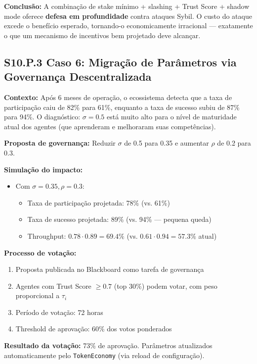 \textbf{Conclusão:} A combinação de stake mínimo + slashing + Trust Score + shadow mode oferece \textbf{defesa em profundidade} contra ataques Sybil. O custo do ataque excede o benefício esperado, tornando-o economicamente irracional --- exatamente o que um mecanismo de incentivos bem projetado deve alcançar.

\subsection*{S10.P.3 Caso 6: Migração de Parâmetros via Governança Descentralizada}

\textbf{Contexto:} Após 6 meses de operação, o ecossistema detecta que a taxa de participação caiu de 82\% para 61\%, enquanto a taxa de sucesso subiu de 87\% para 94\%. O diagnóstico: $\sigma = 0.5$ está muito alto para o nível de maturidade atual dos agentes (que aprenderam e melhoraram suas competências).

\textbf{Proposta de governança:} Reduzir $\sigma$ de 0.5 para 0.35 e aumentar $\rho$ de 0.2 para 0.3.

\textbf{Simulação do impacto:}
\begin{itemize}
    \item Com $\sigma = 0.35, \rho = 0.3$:
    \begin{itemize}
        \item Taxa de participação projetada: 78\% (vs. 61\%)
        \item Taxa de sucesso projetada: 89\% (vs. 94\% --- pequena queda)
        \item Throughput: $0.78 \cdot 0.89 = 69.4\%$ (vs. $0.61 \cdot 0.94 = 57.3\%$ atual)
    \end{itemize}
\end{itemize}

\textbf{Processo de votação:}
\begin{enumerate}
    \item Proposta publicada no Blackboard como tarefa de governança
    \item Agentes com Trust Score $\geq 0.7$ (top 30\%) podem votar, com peso proporcional a $\tau_i$
    \item Período de votação: 72 horas
    \item Threshold de aprovação: 60\% dos votos ponderados
\end{enumerate}

\textbf{Resultado da votação:} 73\% de aprovação. Parâmetros atualizados automaticamente pelo \texttt{TokenEconomy} (via reload de configuração).

